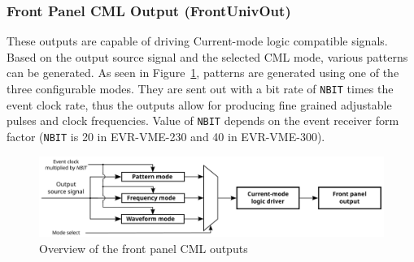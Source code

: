 \documentclass[12pt,a4paper]{article}
\begin{document}
\subsubsection{Front Panel CML Output (FrontUnivOut)}\label{sec:Front Panel CML Output}
These outputs are capable of driving Current-mode logic compatible signals. Based on the output source signal and the selected CML mode, various patterns can be generated. As seen in Figure~\ref{fig:output_cml}, patterns are generated using one of the three configurable modes. They are sent out with a bit rate of \texttt{NBIT} times the event clock rate, thus the outputs allow for producing fine grained adjustable pulses and clock frequencies. Value of \texttt{NBIT} depends on the event receiver form factor (\texttt{NBIT} is 20 in EVR-VME-230 and 40 in EVR-VME-300).
\begin{figure}[H]
	\centering
	\includegraphics[width=\columnwidth]{./img/CML}
	\caption{Overview of the front panel CML outputs}
	\label{fig:output_cml}
\end{figure}
\end{document}
